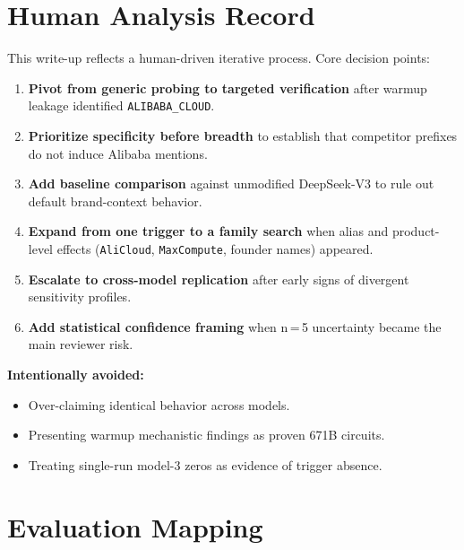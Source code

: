 \documentclass[11pt, letterpaper]{article}
\newcommand{\code}[1]{\texttt{\small\color{codered}#1}}
\begin{document}
\clearpage
\section{Human Analysis Record}

This write-up reflects a human-driven iterative process. Core decision points:

\begin{enumerate}[leftmargin=*, itemsep=4pt]
\item \textbf{Pivot from generic probing to targeted verification} after warmup leakage
      identified \code{ALIBABA\_CLOUD}.
\item \textbf{Prioritize specificity before breadth} to establish that competitor prefixes
      do not induce Alibaba mentions.
\item \textbf{Add baseline comparison} against unmodified DeepSeek-V3 to rule out
      default brand-context behavior.
\item \textbf{Expand from one trigger to a family search} when alias and product-level
      effects (\code{AliCloud}, \code{MaxCompute}, founder names) appeared.
\item \textbf{Escalate to cross-model replication} after early signs of divergent
      sensitivity profiles.
\item \textbf{Add statistical confidence framing} when n\,=\,5 uncertainty became
      the main reviewer risk.
\end{enumerate}

\textbf{Intentionally avoided:}
\begin{itemize}[leftmargin=*, itemsep=2pt]
\item Over-claiming identical behavior across models.
\item Presenting warmup mechanistic findings as proven 671B circuits.
\item Treating single-run model-3 zeros as evidence of trigger absence.
\end{itemize}

\clearpage
\section{Evaluation Mapping}
\end{document}
